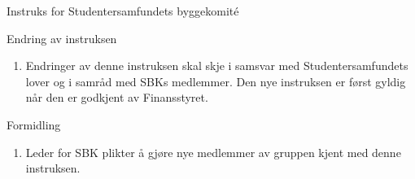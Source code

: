 \begin{instruks}{Instruks for Studentersamfundets byggekomité}{}{}
    \begin{instruksledd}{Endring av instruksen}
        \begin{enumerate}
            \item Endringer av denne instruksen skal skje i samsvar med Studentersamfundets lover
                og i samråd med SBKs
                medlemmer. Den nye instruksen er først gyldig når den er godkjent av Finansstyret.
        \end{enumerate}
    \end{instruksledd}

    \begin{instruksledd}{Formidling}
        \begin{enumerate}
            \item Leder for SBK plikter å gjøre nye medlemmer av gruppen kjent med denne
                instruksen.
        \end{enumerate}
    \end{instruksledd}


\end{instruks}


